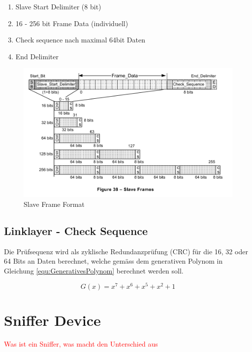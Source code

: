 \begin{enumerate}
    \item Slave Start Delimiter (8 bit)
    \item 16 - 256 bit Frame Data (individuell)
    \item Check sequence nach maximal 64bit Daten 
    \item End Delimiter
\end{enumerate}

\begin{figure}[h!]
    \centering
    \includegraphics[width = 0.8 \textwidth]{Figures/Chap2/Grundlagen/MVB_DOKU/Frames und Telegramme/Fig38_SlaveFrameFormat.png}
    \caption{Slave Frame Format}
    \label{fig:SlaveFrameFormat}
\end{figure}
\newpage

\subsection{Linklayer - Check Sequence}
Die Prüfsequenz wird als zyklische Redundanzprüfung (CRC) für die 16, 32 oder 64 Bits an Daten berechnet, welche gemäss dem generativen Polynom in Gleichung \ref{equ:GenerativesPolynom} berechnet werden soll.

\begin{equation}
    G(x) = x^7 + x^6 + x^5 + x^2 + 1
    \label{equ:GenerativesPolynom}
\end{equation}


\section{Sniffer Device}
\textcolor{red}{Was ist ein Sniffer, was macht den Unterschied aus}



